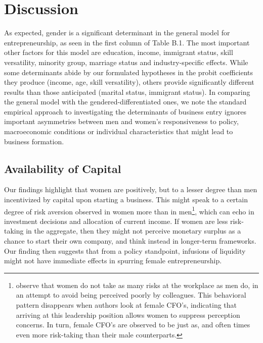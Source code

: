 \chapter{Discussion\label{ch:disc}}

As expected, gender is a significant determinant in the general model for entrepreneurship, as seen in the first column of Table B.1. The most important other factors for this model are education, income, immigrant status, skill versatility, minority group, marriage status and industry-specific effects. While some determinants abide by our formulated hypotheses in the probit coefficients they produce (income, age, skill versatility), others provide significantly different results than those anticipated (marital status, immigrant status). In comparing the general model with the gendered-differentiated ones, we note the standard empirical approach to investigating the determinants of business entry ignores important asymmetries between men and women's responsiveness to policy, macroeconomic conditions or individual characteristics that might lead to business formation. 

\section{Availability of Capital}
Our findings highlight that women are positively, but to a lesser degree than men incentivized by capital upon starting a business. This might speak to a certain degree of risk aversion observed in women more than in men\footnote{\cite{adams2012beyond} observe that women do not take as many risks at the workplace as men do, in an attempt to avoid being perceived poorly by colleagues. This behavioral pattern disappears when authors look at female CFO's, indicating that arriving at this leadership position allows women to suppress perception concerns. In turn, female CFO's are observed to be just as, and often times even more risk-taking than their male counterparts.}, which can echo in investment decisions and allocation of current income. If women are less risk-taking in the aggregate, then they might not perceive monetary surplus as a chance to start their own company, and think instead in longer-term frameworks. Our finding then suggests that from a policy standpoint, infusions of liquidity might not have immediate effects in spurring female entrepreneurship. 

